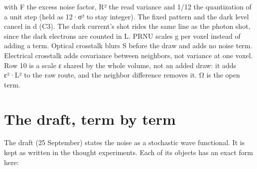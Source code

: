 with F the excess noise factor, R² the read variance and 1/12 the quantization of a unit step (held as 12·σ² to stay integer). The fixed pattern and the dark level cancel in d (C3). The dark current's shot rides the same line as the photon shot, since the dark electrons are counted in L. PRNU scales g per voxel instead of adding a term. Optical crosstalk blurs S before the draw and adds no noise term. Electrical crosstalk adds covariance between neighbors, not variance at one voxel. Row 10 is a scale ε shared by the whole volume, not an added draw: it adds ε²·L² to the raw route, and the neighbor difference removes it. Ω is the open term.

\section{\texorpdfstring{The draft, term by term}{The draft, term by term}}

The draft (25 September) states the noise as a stochastic wave functional. It is kept as written in the thought experiments. Each of its objects has an exact form here:

